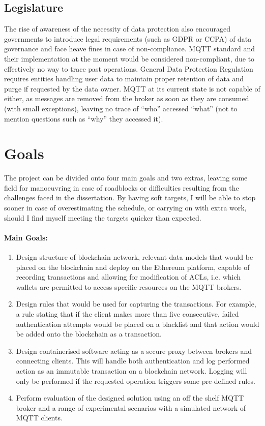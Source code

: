 \subsection{Legislature}
The rise of awareness of the necessity of data protection also encouraged governments to introduce legal requirements (such as GDPR or CCPA) of data governance and face heave fines in case of non-compliance. MQTT standard and their implementation at the moment would be considered non-compliant, due to effectively no way to trace past operations. General Data Protection Regulation requires entities handling user data to maintain proper retention of data and purge if requested by the data owner. MQTT at its current state is not capable of either, as messages are removed from the broker as soon as they are consumed (with small exceptions), leaving no trace of ``who'' accessed ``what'' (not to mention questions such as ``why'' they accessed it).


\section{Goals}

The project can be divided onto four main goals and two extras, leaving some field for manoeuvring in case of roadblocks or difficulties resulting from the challenges faced in the dissertation. By having soft targets, I will be able to stop sooner in case of overestimating the schedule, or carrying on with extra work, should I find myself meeting the targets quicker than expected. 

\paragraph{Main Goals:}
\begin{enumerate}
  \item Design structure of blockchain network, relevant data models that would be placed on the blockchain and deploy on the Ethereum platform, capable of recording transactions and allowing for modification of ACLs, i.e. which wallets are permitted to access specific resources on the MQTT brokers.
  \item Design rules that would be used for capturing the transactions. For example, a rule stating that if the client makes more than five consecutive, failed authentication attempts would be placed on a blacklist and that action would be added onto the blockchain as a transaction. 
  \item Design containerised software acting as a secure proxy between brokers and connecting clients. This will handle both authentication and log performed action as an immutable transaction on a blockchain network. Logging will only be performed if the requested operation triggers some pre-defined rules.
  \item Perform evaluation of the designed solution using an off the shelf MQTT broker and a range of experimental scenarios with a simulated network of MQTT clients.
\end{enumerate}

